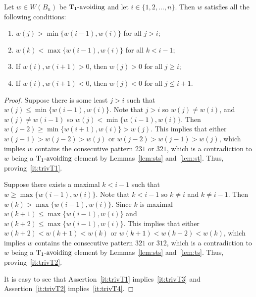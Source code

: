 \begin{lemma}\label{lem:prodofCommB}
Let $w \in W(B_n)$ be $\operatorname{T_1-\mathrm{avoiding}}$ and let $i \in \{1,2, \ldots, n\}$. Then $w$ satisfies all the following conditions:
\begin{enumerate}[leftmargin=2cm]
\item $w(j) > \min\{w(i-1), w(i)\}$ for all $j >i$;\label{it:trivT1}
\item $w(k) < \max\{w(i-1), w(i)\}$ for all $k < i-1$;\label{it:trivT2}
\item If $w(i), w(i+1) > 0$, then $w(j)>0$ for all $j \geq i$;\label{it:trivT3}
\item If $w(i), w(i+1) < 0$, then $w(j)<0$ for all $j \leq i+1$.\label{it:trivT4}
\end{enumerate}
\begin{proof}
	Suppose there is some least $j>i$ such that $w(j) \leq \min\{w(i-1), w(i)\}$. Note that $j>i$ so $w(j) \neq w(i)$, and $w(j) \neq w(i-1)$ so $w(j) < \min\{w(i-1), w(i)\}$. Then $w(j-2) \geq \min\{w(i+1), w(i)\}>w(j)$. This implies that either $w(j-1)>w(j-2)>w(j)$ or $w(j-2)>w(j-1)>w(j)$, which implies $w$ contains the consecutive pattern $231$ or $321$, which is a contradiction to $w$ being a $\operatorname{T_1-\mathrm{avoiding}}$ element by Lemmas~\ref{lem:sts} and~\ref{lem:st}. Thus, proving~\ref{it:trivT1}.
	
	Suppose there exists a maximal $k<i-1$ such that $w \geq \max\{w(i-1), w(i)\}$. Note that $k < i-1$ so $k \neq i$ and $k \neq i-1$. Then $w(k)> \max\{w(i-1), w(i)\}$. Since $k$ is maximal $w(k+1) \leq  \max\{w(i-1), w(i)\}$ and $w(k+2) \leq \max\{w(i-1), w(i)\}$. This implies that either $w(k+2)<w(k+1)<w(k)$ or $w(k+1)<w(k+2)<w(k)$, which implies $w$ contains the consecutive pattern $321$ or $312$, which is a contradiction to $w$ being a $\operatorname{T_1-\mathrm{avoiding}}$ element by Lemmas~\ref{lem:sts} and~\ref{lem:ts}. Thus, proving~\ref{it:trivT2}.
	
	It is easy to see that Assertion~\ref{it:trivT1} implies~\ref{it:trivT3} and Assertion~\ref{it:trivT2} implies~\ref{it:trivT4}.
\end{proof}	
\end{lemma}

